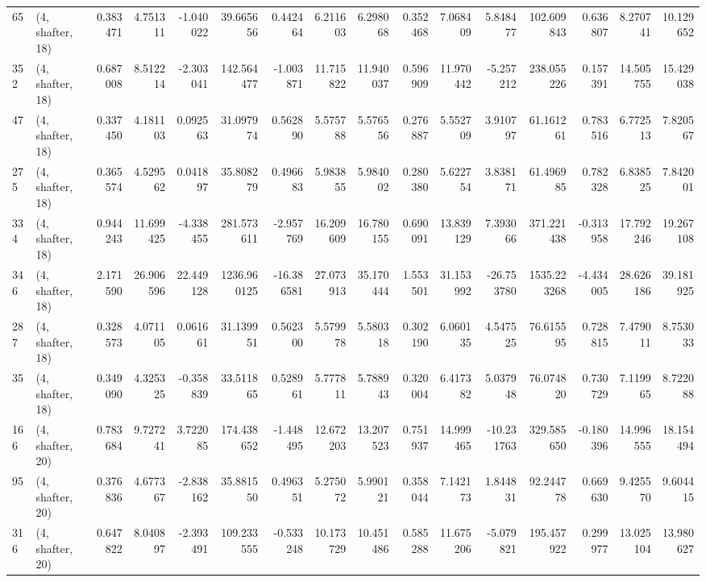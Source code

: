 \begin{tabular}{llrrrrrrrrrrrrrr}
65  &  (4, shafter, 18) &   0.383471 &   4.751311 &  -1.040022 &    39.665656 &   0.442464 &   6.211603 &   6.298068 &  0.352468 &   7.068409 &   5.848477 &   102.609843 &   0.636807 &   8.270741 &  10.129652 \\
352 &  (4, shafter, 18) &   0.687008 &   8.512214 &  -2.303041 &   142.564477 &  -1.003871 &  11.715822 &  11.940037 &  0.596909 &  11.970442 &  -5.257212 &   238.055226 &   0.157391 &  14.505755 &  15.429038 \\
47  &  (4, shafter, 18) &   0.337450 &   4.181103 &   0.092563 &    31.097974 &   0.562890 &   5.575788 &   5.576556 &  0.276887 &   5.552709 &   3.910797 &    61.161261 &   0.783516 &   6.772513 &   7.820567 \\
275 &  (4, shafter, 18) &   0.365574 &   4.529562 &   0.041897 &    35.808279 &   0.496683 &   5.983855 &   5.984002 &  0.280380 &   5.622754 &   3.838171 &    61.496985 &   0.782328 &   6.838525 &   7.842001 \\
334 &  (4, shafter, 18) &   0.944243 &  11.699425 &  -4.338455 &   281.573611 &  -2.957769 &  16.209609 &  16.780155 &  0.690091 &  13.839129 &   7.393066 &   371.221438 &  -0.313958 &  17.792246 &  19.267108 \\
346 &  (4, shafter, 18) &   2.171590 &  26.906596 &  22.449128 &  1236.960125 & -16.386581 &  27.073913 &  35.170444 &  1.553501 &  31.153992 & -26.753780 &  1535.223268 &  -4.434005 &  28.626186 &  39.181925 \\
287 &  (4, shafter, 18) &   0.328573 &   4.071105 &   0.061661 &    31.139951 &   0.562300 &   5.579978 &   5.580318 &  0.302190 &   6.060135 &   4.547525 &    76.615595 &   0.728815 &   7.479011 &   8.753033 \\
35  &  (4, shafter, 18) &   0.349090 &   4.325325 &  -0.358839 &    33.511865 &   0.528961 &   5.777811 &   5.788943 &  0.320004 &   6.417382 &   5.037948 &    76.074820 &   0.730729 &   7.119965 &   8.722088 \\
166 &  (4, shafter, 20) &   0.783684 &   9.727241 &   3.722085 &   174.438652 &  -1.448495 &  12.672203 &  13.207523 &  0.751937 &  14.999465 & -10.231763 &   329.585650 &  -0.180396 &  14.996555 &  18.154494 \\
95  &  (4, shafter, 20) &   0.376836 &   4.677367 &  -2.838162 &    35.881550 &   0.496351 &   5.275072 &   5.990121 &  0.358044 &   7.142173 &   1.844831 &    92.244778 &   0.669630 &   9.425570 &   9.604415 \\
316 &  (4, shafter, 20) &   0.647822 &   8.040897 &  -2.393491 &   109.233555 &  -0.533248 &  10.173729 &  10.451486 &  0.585288 &  11.675206 &  -5.079821 &   195.457922 &   0.299977 &  13.025104 &  13.980627 \\

\end{tabular}

